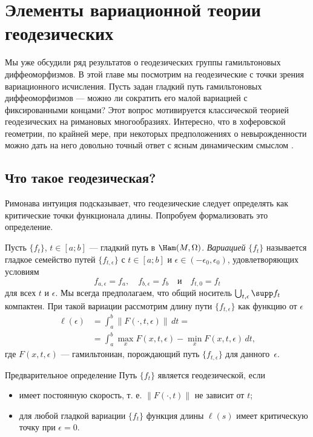 \chapter[Геодезические]{Элементы вариационной теории геодезических}\label{chap:12}

Мы уже обсудили ряд результатов о геодезических группы гамильтоновых диффеоморфизмов.
В этой главе мы посмотрим на геодезические с точки зрения вариационного исчисления.
Пусть задан гладкий путь гамильтоновых диффеоморфизмов --- можно ли сократить его малой вариацией с фиксированными концами?
Этот вопрос мотивируется классической теорией геодезических на римановых многообразиях.
Интересно, что в хоферовской геометрии, по крайней мере, при некоторых предположениях о невырожденности можно дать на него довольно точный ответ с ясным динамическим смыслом \cite{U}.

\section{Что такое геодезическая?}

Римонава интуиция подсказывает, что геодезические следует определять как критические точки функционала длины.
Попробуем формализовать это определение.

Пусть $\{f_t\}$, $t\in[a; b]$ --- гладкий путь в $\Ham(M,\Omega)$.
\emph{Вариацией} $\{f_t\}$ называется гладкое семейство путей $\{f_{t,\epsilon}\}$ с $t \in [a; b]$ и $\epsilon \in (-\epsilon_0, \epsilon_0)$, удовлетворяющих условиям
\[f_{a,\epsilon} = f_a,\quad f_{b,\epsilon} = f_b\quad\text{и}\quad f_{t,0} = f_t\]
для всех $t$ и $\epsilon$.
Мы всегда предполагаем, что общий носитель $\bigcup_{t,\epsilon}\supp f_t$ компактен.
При такой вариации рассмотрим длину пути $\{f_{t,\epsilon}\}$ как функцию от $\epsilon$ 
\begin{align*}
\ell(\epsilon)&=\int_a^b\|F(\cdot,t,\epsilon)\|\,dt=
\\
&=\int_a^b \max_x F(x,t,\epsilon)-\min_x F(x,t,\epsilon)\,dt,
\end{align*} 
где $F(x, t, \epsilon)$ --- гамильтониан, порождающий путь $\{f_{t,\epsilon}\}$ для данного~$\epsilon$.

\begin{ex}{Предварительное определение}\label{12.1.A}
Путь $\{f_t\}$ является геодезической, если
\begin{itemize}
\item имеет постоянную скорость, т. е. $\|F(\cdot, t)\|$ не зависит от $t$;
\item для любой гладкой вариации $\{f_t\}$ функция длины $\ell(s)$ имеет критическую точку при $\epsilon = 0$.
\end{itemize}
\end{ex}

